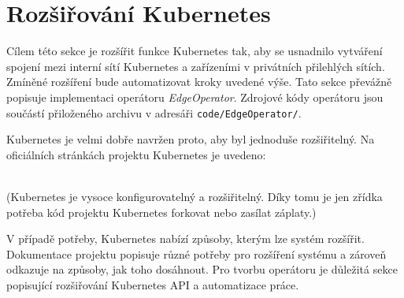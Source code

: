 \section{Rozšiřování Kubernetes}\label{sec:extend}
Cílem této sekce je rozšířit funkce Kubernetes tak, aby se usnadnilo vytváření spojení mezi interní sítí Kubernetes a zařízeními v privátních přilehlých sítích. Zmíněné rozšíření bude automatizovat kroky uvedené výše. Tato sekce převážně popisuje implementaci operátoru \textit{EdgeOperator}. Zdrojové kódy operátoru jsou součástí přiloženého archivu v adresáři \verb|code/EdgeOperator/|.

Kubernetes je velmi dobře navržen proto, aby byl jednoduše rozšiřitelný. Na oficiálních stránkách projektu Kubernetes je uvedeno: 
\begin{displayquote}
\textit{} \cite{kubernetestheauthors_2023_extending}\\(Kubernetes je vysoce konfigurovatelný a rozšiřitelný. Díky tomu je jen zřídka potřeba kód projektu Kubernetes forkovat nebo zasílat záplaty.)
\end{displayquote}

V případě potřeby, Kubernetes nabízí způsoby, kterým lze systém rozšířit. Dokumentace projektu popisuje různé potřeby pro rozšíření systému a zároveň odkazuje na způsoby, jak toho dosáhnout. Pro tvorbu operátoru je důležitá sekce popisující rozšiřování Kubernetes API a automatizace práce.



